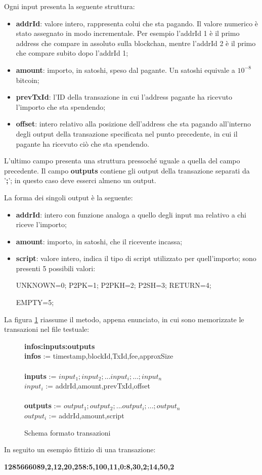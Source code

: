 Ogni input presenta la seguente struttura:
\begin{itemize}
    \item \textbf{addrId}: valore intero, rappresenta colui che sta pagando. Il valore numerico è stato assegnato in modo incrementale.
    Per esempio l'addrId 1 è il primo address che compare in assoluto sulla blockchan, mentre l'addrId 2 è il primo che compare subito dopo l'addrId 1;
    \item \textbf{amount}: importo, in satoshi, speso dal pagante. Un satoshi equivale a $10^{-8}$ bitcoin; 
    \item \textbf{prevTxId}: l'ID della transazione in cui l’address pagante ha ricevuto l’importo che sta spendendo;
    \item \textbf{offset}: intero relativo alla posizione dell’address che sta pagando all’interno degli output della transazione specificata nel punto precedente, in cui il pagante ha ricevuto ciò che sta spendendo.
\end{itemize}
L'ultimo campo presenta una struttura pressoché uguale a quella del campo precedente.
Il campo \textbf{outputs} contiene gli output della transazione separati da '\textbf{;}'; in questo caso deve esserci almeno un output.

La forma dei singoli output è la seguente:
\begin{itemize}
    \item \textbf{addrId}: intero con funzione analoga a quello degli input ma relativo a chi riceve l'importo; 
    \item \textbf{amount}: importo, in satoshi, che il ricevente incassa;
    \item \textbf{script}: valore intero, indica il tipo di script utilizzato per quell'importo; sono presenti 5 possibili valori: 
    
    UNKNOWN=0; P2PK=1; P2PKH=2; P2SH=3; RETURN=4;
    
    EMPTY=5;
\end{itemize}
La figura \ref{tx} riassume il metodo, appena enunciato, in cui sono memorizzate le transazioni nel file testuale:
\begin{figure}[h]
\begin{mdframed}
\textbf{infos:inputs:outputs}\\
\textbf{infos} := timestamp,blockId,TxId,fee,approxSize\\\\
\textbf{inputs} := $input_1;input_2;...input_i;...;input_n$\\
$input_i$ := addrId,amount,prevTxId,offset\\\\
\textbf{outputs} := $output_1;output_2;...output_i;...;output_n$\\
$output_i$ := addrId,amount,script
\end{mdframed}
\caption{Schema formato transazioni}
\label{tx}
\end{figure}
\FloatBarrier
In seguito un esempio fittizio di una transazione:
\begin{center}
\textbf{1285666089,2,12,20,258:5,100,11,0:8,30,2;14,50,2}
\end{center}

